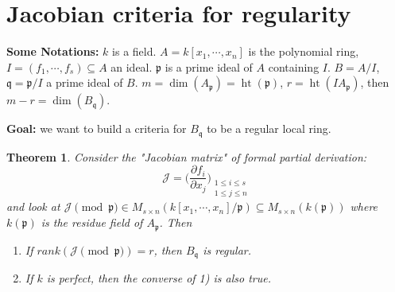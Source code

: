 \documentclass[cs4size]{article}
\newcommand{\su}{\subseteq}
\newcommand{\rk}{rank}
\newcommand{\caJ}{\mathcal{J}}
\newcommand{\frp}{\mathfrak{p}}
\newcommand{\frq}{\mathfrak{q}}
\DeclareMathOperator{\height}{ht}
\newtheorem{thm}{Theorem}
\begin{document}
\section{Jacobian criteria for regularity}
\textbf{Some Notations:} $k$ is a field. $A=k[x_1,\cdots,x_n]$ is the polynomial ring, $I=(f_1,\cdots,f_s)\su A$ an ideal. $\frp$ is a prime ideal of $A$ containing $I$. $B=A/I$, $\frq=\frp/I$ a prime ideal of $B$. $m=\dim(A_\frp)=\height(\frp)$, $r=\height(IA_\frp)$, then $m-r=\dim(B_\frq)$.

\textbf{Goal:} we want to build a criteria for $B_\frq$ to be a regular local ring.

\begin{thm}
Consider the "Jacobian matrix" of formal partial derivation: \[\caJ=\bigg(\frac{\partial f_i}{\partial x_j}\bigg)_{\substack{1\leq i\leq s\\ 1\leq j\leq n}}\] and look at $\caJ\pmod{\frp}\in M_{s\times n}(k[x_1,\cdots,x_n]/\frp)\su M_{s\times n}(k(\frp))$ where $k(\frp)$ is the residue field of $A_\frp$. Then
\begin{enumerate}
\item If $\rk(\caJ\pmod{\frp})=r$, then $B_\frq$ is regular.
\item If $k$ is perfect, then the converse of 1) is also true.
\end{enumerate}
\end{thm}
\end{document}
